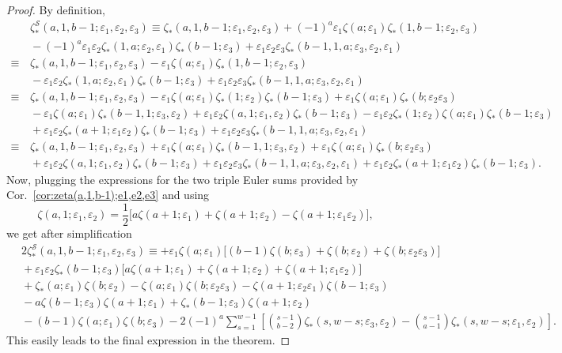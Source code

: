 \documentclass[10pt,a4paper]{amsart}
\newcommand{\Sy}{{\mathcal S}}
\newcommand\eps{{\varepsilon}}
\begin{document}
\begin{proof}
By definition,
\begin{align*}
 &\, \zeta_\ast^\Sy(a,1,b-1;\eps_1,\eps_2,\eps_3)
\equiv \zeta_\ast(a,1,b-1;\eps_1,\eps_2,\eps_3)+(-1)^a \eps_1\zeta(a;\eps_1)\zeta_*(1,b-1;\eps_2,\eps_3)\\
&\,-(-1)^a \eps_1 \eps_2 \zeta_*(1,a;\eps_2,\eps_1)\zeta_*(b-1;\eps_3)
+\eps_1\eps_2\eps_3\zeta_\ast(b-1,1,a;\eps_3,\eps_2,\eps_1)\\
\equiv &\, \zeta_\ast(a,1,b-1;\eps_1,\eps_2,\eps_3)- \eps_1\zeta(a;\eps_1)\zeta_*(1,b-1;\eps_2,\eps_3)\\
&\,-\eps_1\eps_2\zeta_*(1,a;\eps_2,\eps_1)\zeta_*(b-1;\eps_3)+\eps_1\eps_2\eps_3\zeta_\ast(b-1,1,a;\eps_3,\eps_2,\eps_1)\\
\equiv &\, \zeta_\ast(a,1,b-1;\eps_1,\eps_2,\eps_3)-\eps_1\zeta(a;\eps_1)\zeta_*(1;\eps_2)\zeta_*(b-1;\eps_3)
+\eps_1\zeta(a;\eps_1)\zeta_*(b;\eps_2\eps_3)\\
&\,-\eps_1\zeta(a;\eps_1)\zeta_*(b-1,1;\eps_3,\eps_2)+\eps_1 \eps_2 \zeta(a,1;\eps_1,\eps_2)\zeta_*(b-1;\eps_3)- \eps_1 \eps_2 \zeta_*(1;\eps_2)\zeta(a;\eps_1)\zeta_*(b-1;\eps_3)\\
&\, +\eps_1 \eps_2 \zeta_*(a+1;\eps_1\eps_2)\zeta_*(b-1;\eps_3)
+\eps_1\eps_2\eps_3\zeta_\ast(b-1,1,a;\eps_3,\eps_2,\eps_1)\\
\equiv &\, \zeta_\ast(a,1,b-1;\eps_1,\eps_2,\eps_3)+\eps_1\zeta(a;\eps_1)\zeta_*(b-1,1;\eps_3,\eps_2)
+\eps_1\zeta(a;\eps_1)\zeta_*(b;\eps_2\eps_3)\\
&\,+\eps_1 \eps_2 \zeta(a,1;\eps_1,\eps_2)\zeta_*(b-1;\eps_3)
+\eps_1\eps_2\eps_3\zeta_\ast(b-1,1,a;\eps_3,\eps_2,\eps_1)
+\eps_1 \eps_2 \zeta_*(a+1;\eps_1\eps_2)\zeta_*(b-1;\eps_3).
\end{align*}
Now, plugging the expressions for the two triple Euler sums provided by Cor.~\ref{cor:zeta(a,1,b-1);e1,e2,e3} and using
\begin{equation*}
\zeta(a,1;\eps_1,\eps_2)=\frac12\Big[a\zeta(a+1; \eps_1)+\zeta(a+1; \eps_2)-\zeta(a+1; \eps_1\eps_2)\Big],
\end{equation*}
we get after simplification
 \begin{align*}
 &\, 2\zeta_\ast^\Sy(a,1,b-1;\eps_1,\eps_2,\eps_3)
\equiv
+ \eps_1 \zeta(a;\eps_1)\Big[(b-1)\zeta(b; \eps_3)+\zeta(b;\eps_2)+\zeta(b;\eps_2\eps_3)\Big]\\
&\,+ \eps_1 \eps_2  \zeta_*(b-1;\eps_3)\Big[a\zeta(a+1; \eps_1)+\zeta(a+1; \eps_2)+\zeta(a+1; \eps_1\eps_2)\Big]\\
&\, +\zeta_*(a;\eps_1)\zeta(b; \eps_2)-\zeta(a;\eps_1)\zeta(b;\eps_2\eps_3)-\zeta(a+1;\eps_2\eps_1)\zeta(b-1;\eps_3)\\
&\, -a\zeta(b-1;\eps_3) \zeta(a+1;\eps_1)+\zeta_*(b-1;\eps_3)\zeta(a+1; \eps_2)\\
&\, -(b-1) \zeta(a;\eps_1) \zeta(b;\eps_3)
  -2(-1)^{a}\sum_{s=1}^{w-1}\left[ \binom{s-1}{b-2} \zeta_*(s,w-s;\eps_3,\eps_2) -\binom{s-1}{a-1}\zeta_*(s,w-s;\eps_1,\eps_2)\right].
\end{align*}
This easily leads to the final expression in the theorem.
\end{proof}
\end{document}
